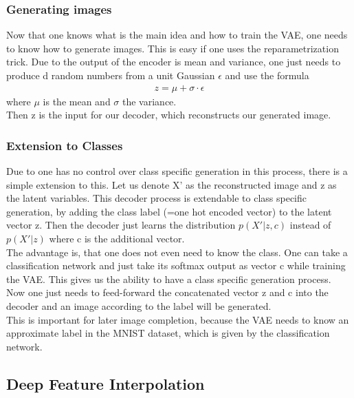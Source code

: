 \documentclass[
     11pt,         %
     a4paper,      %
     oneside,
     ]{article}
\begin{document}
\subsubsection{Generating images}
Now that one knows what is the main idea and how to train the VAE, one needs to know how to generate images. This is easy if one uses the reparametrization trick. Due to the output of the encoder is mean and variance, one just needs to produce d random numbers from a unit Gaussian $\epsilon$ and use the formula
\begin{align*}
  z = \mu + \sigma \cdot \epsilon
\end{align*}
where $\mu$ is the mean and $\sigma$ the variance.\\
Then z is the input for our decoder, which reconstructs our generated image.

\subsubsection{Extension to Classes}
Due to one has no control over class specific generation in this process, there is a simple extension to this. Let us denote X' as the reconstructed image and z as the latent variables. This decoder process is extendable to class specific generation, by adding the class label (=one hot encoded vector) to the latent vector z. Then the decoder just learns the distribution $p(X'|z,c)$ instead of  $p(X'|z)$ where c is the additional vector.\\
The advantage is, that one does not even need to know the class. One can take a classification network and just take its softmax output as vector c while training the VAE. This gives us the ability to have a class specific generation process. Now one just needs to feed-forward the concatenated vector z and c into the decoder and an image according to the label will be generated.\\
This is important for later image completion, because the VAE needs to know an approximate label in the MNIST dataset, which is given by the classification network.

\subsection{Deep Feature Interpolation}
\end{document}
